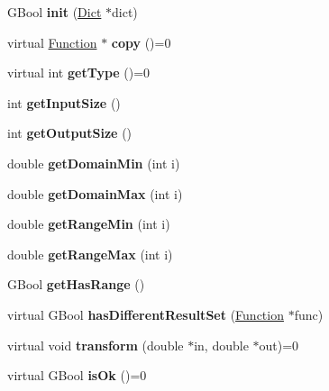 \begin{DoxyCompactItemize}
\item 
\mbox{\label{class_function_ad0636679b03ed395ebda1332d20db149}} 
G\+Bool {\bfseries init} (\hyperlink{class_dict}{Dict} $\ast$dict)
\item 
\mbox{\label{class_function_a7124f1598043122cc38639e33e80c97e}} 
virtual \hyperlink{class_function}{Function} $\ast$ {\bfseries copy} ()=0
\item 
\mbox{\label{class_function_a4787a45ad7d946ce4958d3ef5436a34d}} 
virtual int {\bfseries get\+Type} ()=0
\item 
\mbox{\label{class_function_ad2541961d470c65a468d9a5be1238cd9}} 
int {\bfseries get\+Input\+Size} ()
\item 
\mbox{\label{class_function_a5d8d90a099b865aa42c7f90ae076521f}} 
int {\bfseries get\+Output\+Size} ()
\item 
\mbox{\label{class_function_a57c4c3228159a304c175324faa52ce28}} 
double {\bfseries get\+Domain\+Min} (int i)
\item 
\mbox{\label{class_function_a3168767848a2a073835841640a84f754}} 
double {\bfseries get\+Domain\+Max} (int i)
\item 
\mbox{\label{class_function_a08d9a249f6dea2bde2da3ed0bc17ee18}} 
double {\bfseries get\+Range\+Min} (int i)
\item 
\mbox{\label{class_function_a713fb58959968a9653b170d17ef93129}} 
double {\bfseries get\+Range\+Max} (int i)
\item 
\mbox{\label{class_function_a2382b79f8c097baea7961cd51e4f292a}} 
G\+Bool {\bfseries get\+Has\+Range} ()
\item 
\mbox{\label{class_function_a45b8cff53bba65523631fc66aa0f9f63}} 
virtual G\+Bool {\bfseries has\+Different\+Result\+Set} (\hyperlink{class_function}{Function} $\ast$func)
\item 
\mbox{\label{class_function_ab1d76848aed832e1919fadf2b57210b6}} 
virtual void {\bfseries transform} (double $\ast$in, double $\ast$out)=0
\item 
\mbox{\label{class_function_a3f407d8642ffac957855045725477cdd}} 
virtual G\+Bool {\bfseries is\+Ok} ()=0
\end{DoxyCompactItemize}
